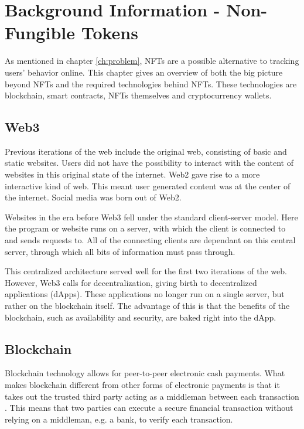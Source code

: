 \chapter{Background Information - Non-Fungible Tokens}
\label{ch:bg_tech}
As mentioned in chapter \ref{ch:problem}, NFTs are a possible alternative to tracking users' behavior online. This chapter gives an overview of both the big picture beyond NFTs and the required technologies behind NFTs. These technologies are blockchain, smart contracts, NFTs themselves and cryptocurrency wallets.

%
%
\section{Web3}
\label{sec:bg_tech:web3}
Previous iterations of the web include the original web, consisting of basic and static websites. Users did not have the possibility to interact with the content of websites in this original state of the internet. Web2 gave rise to a more interactive kind of web. This meant user generated content was at the center of the internet. Social media was born out of Web2. \cite{previousWebIterations}


Websites in the era before Web3 fell under the standard client-server model. Here the program or website runs on a server, with which the client is connected to and sends requests to. All of the connecting clients are dependant on this central server, through which all bits of information must pass through. \cite{dapps}

This centralized architecture served well for the first two iterations of the web. However, Web3 calls for decentralization, giving birth to decentralized applications (dApps). These applications no longer run on a single server, but rather on the blockchain itself. The advantage of this is that the benefits of the blockchain, such as availability and security, are baked right into the dApp. \cite{dapps}


%
%
\section{Blockchain}
\label{sec:bg_tech:blockchain}
Blockchain technology allows for peer-to-peer electronic cash payments. What makes blockchain different from other forms of electronic payments is that it takes out the trusted third party acting as a middleman between each transaction \cite{bitcoin}. This means that two parties can execute a secure financial transaction without relying on a middleman, e.g. a bank, to verify each transaction.

